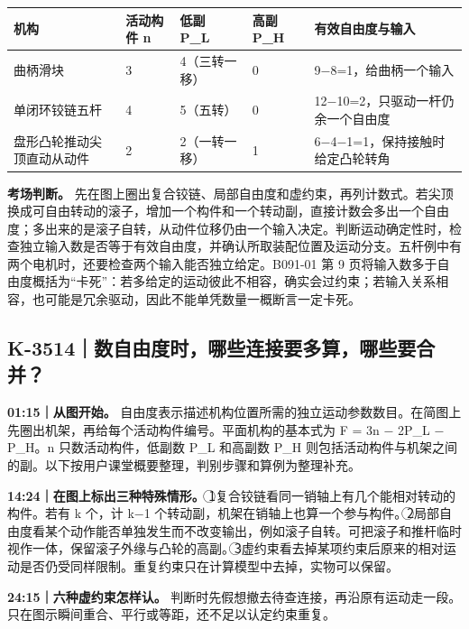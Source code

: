 \documentclass[zihao=5,a4paper,UTF8,fontset=fandol]{ctexart}
\begin{document}
\begin{longtable}{p{2.74cm}p{2.74cm}p{2.74cm}p{2.74cm}p{2.74cm}}
\toprule
机构 & 活动构件 n & 低副 P\_L & 高副 P\_H & 有效自由度与输入 \\

\midrule
\endhead
曲柄滑块 & 3 & 4（三转一移） & 0 & 9$-$8=1，给曲柄一个输入 \\
单闭环铰链五杆 & 4 & 5（五转） & 0 & 12$-$10=2，只驱动一杆仍余一个自由度 \\
盘形凸轮推动尖顶直动从动件 & 2 & 2（一转一移） & 1 & 6$-$4$-$1=1，保持接触时给定凸轮转角 \\
\bottomrule
\end{longtable}

\textbf{考场判断。} 先在图上圈出复合铰链、局部自由度和虚约束，再列计数式。若尖顶换成可自由转动的滚子，增加一个构件和一个转动副，直接计数会多出一个自由度；多出来的是滚子自转，从动件位移仍由一个输入决定。判断运动确定性时，检查独立输入数是否等于有效自由度，并确认所取装配位置及运动分支。五杆例中有两个电机时，还要检查两个输入能否独立给定。B091-01 第 9 页将输入数多于自由度概括为“卡死”：若多给定的运动彼此不相容，确实会过约束；若输入关系相容，也可能是冗余驱动，因此不能单凭数量一概断言一定卡死。





\subsection{K-3514｜数自由度时，哪些连接要多算，哪些要合并？}
\label{k-3514}

\textbf{01:15｜从图开始。} 自由度表示描述机构位置所需的独立运动参数数目。在简图上先圈出机架，再给每个活动构件编号。平面机构的基本式为 F = 3n $-$ 2P\_L $-$ P\_H。n 只数活动构件，低副数 P\_L 和高副数 P\_H 则包括活动构件与机架之间的副。以下按用户课堂概要整理，判别步骤和算例为整理补充。


\textbf{14:24｜在图上标出三种特殊情形。} \textcircled{1}复合铰链看同一销轴上有几个能相对转动的构件。若有 k 个，计 k$-$1 个转动副，机架在销轴上也算一个参与构件。\textcircled{2}局部自由度看某个动作能否单独发生而不改变输出，例如滚子自转。可把滚子和推杆临时视作一体，保留滚子外缘与凸轮的高副。\textcircled{3}虚约束看去掉某项约束后原来的相对运动是否仍受同样限制。重复约束只在计算模型中去掉，实物可以保留。


\textbf{24:15｜六种虚约束怎样认。} 判断时先假想撤去待查连接，再沿原有运动走一段。只在图示瞬间重合、平行或等距，还不足以认定约束重复。
\end{document}
